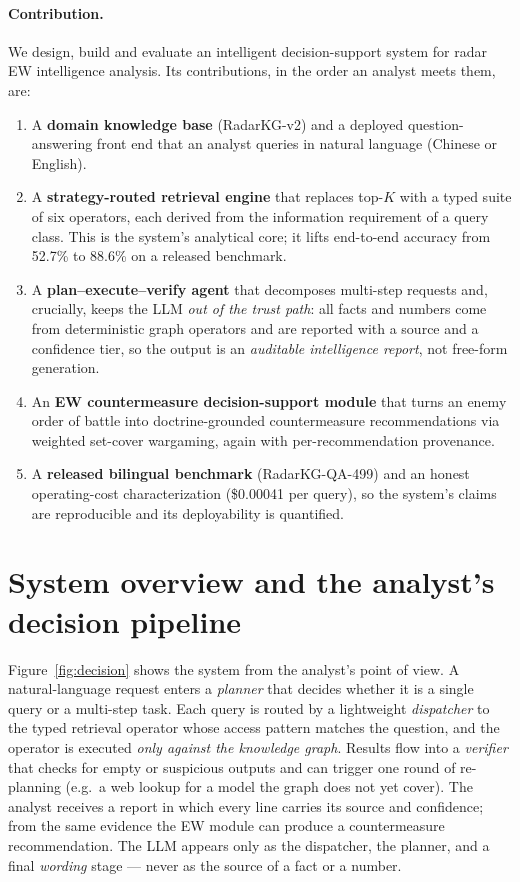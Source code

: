 \documentclass[review]{elsarticle}
\begin{document}
\paragraph{Contribution.}
We design, build and evaluate an intelligent decision-support system for radar
EW intelligence analysis. Its contributions, in the order an analyst meets
them, are:
\begin{enumerate}[leftmargin=1.4em,itemsep=2pt]
\item A \textbf{domain knowledge base} (RadarKG-v2) and a deployed
question-answering front end that an analyst queries in natural language
(Chinese or English).
\item A \textbf{strategy-routed retrieval engine} that replaces top-$K$ with a
typed suite of six operators, each derived from the information requirement of
a query class. This is the system's analytical core; it lifts end-to-end
accuracy from 52.7\% to 88.6\% on a released benchmark.
\item A \textbf{plan--execute--verify agent} that decomposes multi-step
requests and, crucially, keeps the LLM \emph{out of the trust path}: all facts
and numbers come from deterministic graph operators and are reported with a
source and a confidence tier, so the output is an \emph{auditable intelligence
report}, not free-form generation.
\item An \textbf{EW countermeasure decision-support module} that turns an enemy
order of battle into doctrine-grounded countermeasure recommendations via
weighted set-cover wargaming, again with per-recommendation provenance.
\item A \textbf{released bilingual benchmark} (RadarKG-QA-499) and an honest
operating-cost characterization (\$0.00041 per query), so the system's claims
are reproducible and its deployability is quantified.
\end{enumerate}

\section{System overview and the analyst's decision pipeline}
\label{sec:overview}

Figure~\ref{fig:decision} shows the system from the analyst's point of view.
A natural-language request enters a \emph{planner} that decides whether it is a
single query or a multi-step task. Each query is routed by a lightweight
\emph{dispatcher} to the typed retrieval operator whose access pattern matches
the question, and the operator is executed \emph{only against the knowledge
graph}. Results flow into a \emph{verifier} that checks for empty or
suspicious outputs and can trigger one round of re-planning (e.g.\ a web lookup
for a model the graph does not yet cover). The analyst receives a report in
which every line carries its source and confidence; from the same evidence the
EW module can produce a countermeasure recommendation. The LLM appears only as
the dispatcher, the planner, and a final \emph{wording} stage --- never as the
source of a fact or a number.
\end{document}
